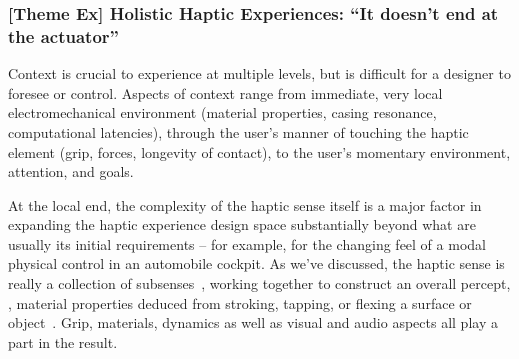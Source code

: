 \subsubsection{\textbf{[Theme Ex]} Holistic Haptic Experiences: ``It doesn't end at the actuator''}
\label{sec:interviews:experience}
%
\noindent 
Context is crucial to experience at multiple levels, but is difficult for a designer to foresee or control. 
Aspects of context range from immediate, very local electromechanical environment (material properties, casing resonance, computational latencies), through the user's manner of touching the haptic element (grip, forces, longevity of contact), to the user's momentary environment, attention, and goals.


At the local end, the complexity of the haptic sense itself is a major factor in expanding the haptic experience design space substantially beyond what are usually its initial requirements -- for example, for the changing feel of a modal physical control in an automobile cockpit.
%
As we've discussed, 
the haptic sense is really a collection of subsenses~\citep{Kandel2000,ChoiKuchenbecker2013}, working together to construct an overall percept, \eg, material properties deduced from stroking, tapping, or flexing a surface or object~\citep{Lederman1987}.
Grip, materials, dynamics as well as visual and audio aspects all play a part in the result.
%
\begin{quote}
\end{quote}

